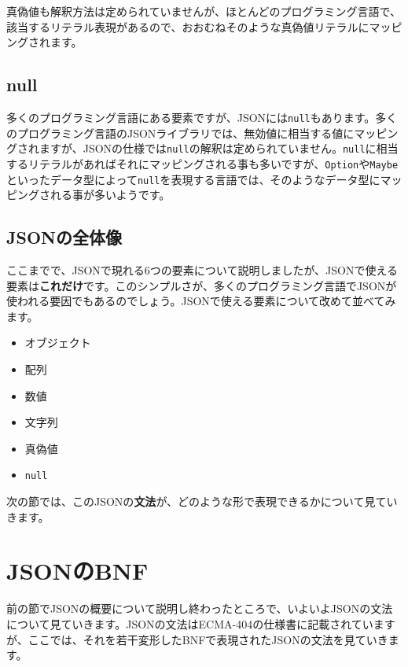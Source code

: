 真偽値も解釈方法は定められていませんが、ほとんどのプログラミング言語で、該当するリテラル表現があるので、おおむねそのような真偽値リテラルにマッピングされます。

\hypertarget{chapter3-null}{%
\subsection{null}\label{chapter3-null}}

多くのプログラミング言語にある要素ですが、JSONには\texttt{null}もあります。多くのプログラミング言語のJSONライブラリでは、無効値に相当する値にマッピングされますが、JSONの仕様では\texttt{null}の解釈は定められていません。\texttt{null}に相当するリテラルがあればそれにマッピングされる事も多いですが、\texttt{Option}や\texttt{Maybe}といったデータ型によって\texttt{null}を表現する言語では、そのようなデータ型にマッピングされる事が多いようです。

\hypertarget{chapter3-jsonux306eux5168ux4f53ux50cf}{%
\subsection{JSONの全体像}\label{chapter3-jsonux306eux5168ux4f53ux50cf}}

ここまでで、JSONで現れる6つの要素について説明しましたが、JSONで使える要素は\textbf{これだけ}です。このシンプルさが、多くのプログラミング言語でJSONが使われる要因でもあるのでしょう。JSONで使える要素について改めて並べてみます。

\begin{itemize}
\tightlist
\item
  オブジェクト
\item
  配列
\item
  数値
\item
  文字列
\item
  真偽値
\item
  \texttt{null}
\end{itemize}

次の節では、このJSONの\textbf{文法}が、どのような形で表現できるかについて見ていきます。

\hypertarget{chapter3-jsonux306ebnf}{%
\section{JSONのBNF}\label{chapter3-jsonux306ebnf}}

前の節でJSONの概要について説明し終わったところで、いよいよJSONの文法について見ていきます。JSONの文法はECMA-404の仕様書に記載されていますが、ここでは、それを若干変形したBNFで表現されたJSONの文法を見ていきます。

